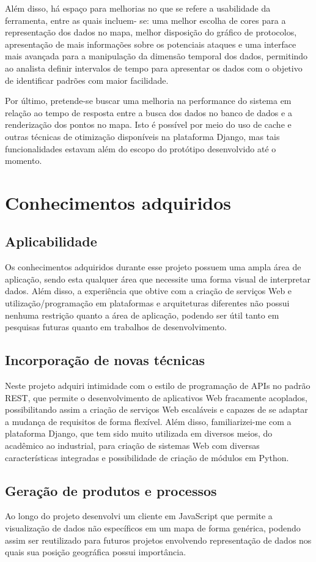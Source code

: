 Além disso, há espaço para melhorias no que se refere a usabilidade da ferramenta, entre as quais incluem- se: uma melhor escolha de cores para a representação dos dados no mapa, melhor disposição do gráfico de protocolos, apresentação de mais informações sobre os potenciais ataques e uma interface mais avançada para a manipulação da dimensão temporal dos dados, permitindo ao analista definir intervalos de tempo para apresentar os dados com o objetivo de identificar padrões com maior facilidade.

Por último, pretende-se buscar uma melhoria na performance do sistema em relação ao tempo de resposta entre a busca dos dados no banco de dados e a renderização dos pontos no mapa. Isto é possível por meio do uso de cache e outras técnicas de otimização disponíveis na plataforma Django, mas tais funcionalidades estavam além do escopo do protótipo desenvolvido até o momento.


\chapter{Conhecimentos adquiridos}
\section{Aplicabilidade}
Os conhecimentos adquiridos durante esse projeto possuem uma ampla área de aplicação, sendo esta qualquer área que necessite uma forma visual de interpretar dados. Além disso, a experiência que obtive com a criação de serviços Web e utilização/programação em plataformas e arquiteturas diferentes não possui nenhuma restrição quanto a área de aplicação, podendo ser útil tanto em pesquisas futuras quanto em trabalhos de desenvolvimento.

\section{Incorporação de novas técnicas}
Neste projeto adquiri intimidade com o estilo de programação de APIs no padrão REST, que permite o desenvolvimento de aplicativos Web fracamente acoplados, possibilitando assim a criação de serviços Web escaláveis e capazes de se adaptar a mudança de requisitos de forma flexível. Além disso, familiarizei-me com a plataforma Django, que tem sido muito utilizada em diversos meios, do acadêmico ao industrial, para criação de sistemas Web com diversas características integradas e possibilidade de criação de módulos em Python.

\section{Geração de produtos e processos}
Ao longo do projeto desenvolvi um cliente em JavaScript que permite a visualização de dados não específicos em um mapa de forma genérica, podendo assim ser reutilizado para futuros projetos envolvendo representação de dados nos quais sua posição geográfica possui importância.

